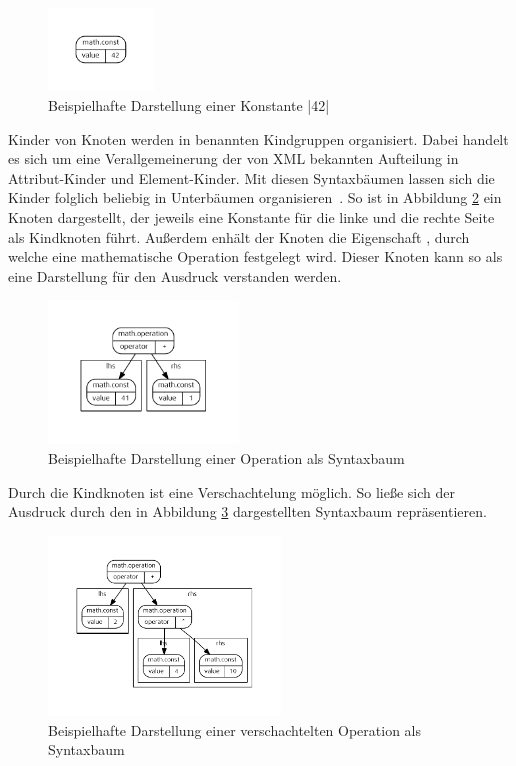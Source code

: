 \begin{figure}[h]
  \centering
  \includegraphics[width=0.25\textwidth]{gfx/basics-syntaxtrees-1.graphviz.pdf}
  \caption{Beispielhafte Darstellung einer Konstante \inlinec|42|}
  \label{fig:basics:syntaxtrees:1}
\end{figure}

Kinder von Knoten werden in benannten Kindgruppen organisiert. Dabei handelt es sich um eine Verallgemeinerung der von XML bekannten Aufteilung in Attribut-Kinder und Element-Kinder. Mit diesen Syntaxbäumen lassen sich die Kinder folglich beliebig in Unterbäumen organisieren~\cite[4]{riemer2018}. So ist in Abbildung \ref{fig:basics:syntaxtrees:2} ein Knoten  dargestellt, der jeweils eine Konstante für die linke und die rechte Seite als Kindknoten führt. Außerdem enhält der Knoten die Eigenschaft , durch welche eine mathematische Operation festgelegt wird. Dieser Knoten kann so als eine Darstellung für den Ausdruck  verstanden werden.

\begin{figure}[h]
  \centering
  \includegraphics[width=0.45\textwidth]{gfx/basics-syntaxtrees-2.graphviz.pdf}
  \caption{Beispielhafte Darstellung einer Operation als Syntaxbaum}
  \label{fig:basics:syntaxtrees:2}
\end{figure}

Durch die Kindknoten ist eine Verschachtelung möglich. So ließe sich der Ausdruck  durch den in Abbildung \ref{fig:basics:syntaxtrees:3} dargestellten Syntaxbaum repräsentieren.

\begin{figure}[h]
  \centering
  \includegraphics[width=0.55\textwidth]{gfx/basics-syntaxtrees-3.graphviz.pdf}
  \caption{Beispielhafte Darstellung einer verschachtelten Operation als Syntaxbaum}
  \label{fig:basics:syntaxtrees:3}
\end{figure}

